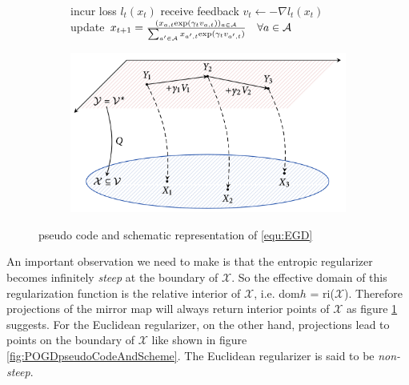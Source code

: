 \begin{figure}[H]
\centering
\begin{subfigure}{.55\textwidth}
    \begin{algorithm}[H]
    \DontPrintSemicolon
     {
    incur loss $l_t(x_t)$ \;
    receive feedback $v_t \gets -\nabla l_t(x_t)$ \;
    update $x_{t+1} = \frac{(x_{a,t}\textnormal{exp}(\gamma_t v_{a,t}))_{a\in\mathcal{A}}}{\sum_{a'\in\mathcal{A}}x_{a',t}\textnormal{exp}(\gamma_t v_{a',t})} \quad \forall a \in \mathcal{A}$ \;
    }
    \end{algorithm}
\end{subfigure}%
\begin{subfigure}{.45\textwidth}
  \centering
  \includegraphics[width=.99\linewidth]{logos/EGDscheme.png}
\end{subfigure}
\caption{pseudo code and schematic representation of \ref{equ:EGD}}
\label{fig:EGDpseudoCodeAndScheme}
\end{figure}

An important observation we need to make is that the entropic regularizer becomes infinitely \textit{steep} at the boundary of $\mathcal{X}$. So the effective domain of this regularization function is the relative interior of $\mathcal{X}$, i.e. dom$h$ = ri($\mathcal{X}$). Therefore projections of the mirror map will always return interior points of $\mathcal{X}$ as figure \ref{fig:EGDpseudoCodeAndScheme} suggests. For the Euclidean regularizer, on the other hand, projections lead to points on the boundary of $\mathcal{X}$ like shown in figure \ref{fig:POGDpseudoCodeAndScheme}. The Euclidean regularizer is said to be \textit{non-steep}. \\

